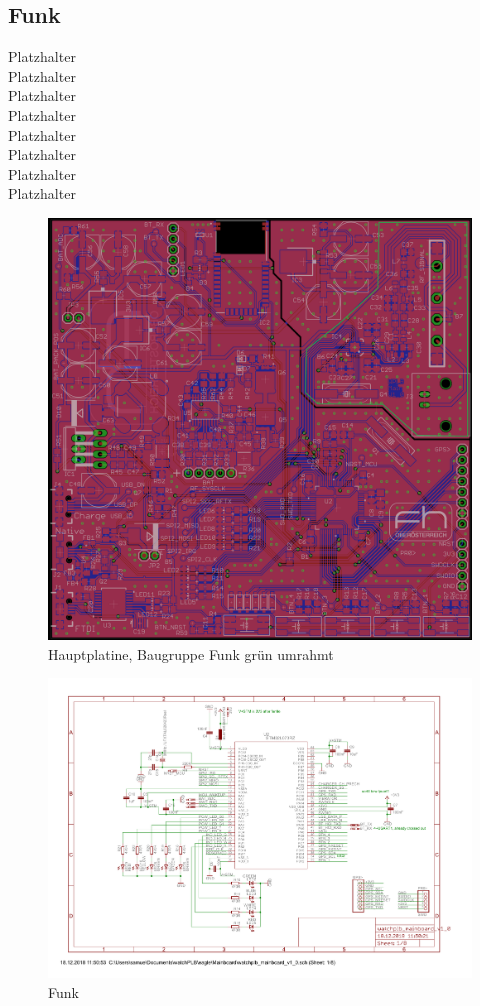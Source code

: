 \documentclass[a4paper]{scrartcl}
\begin{document}
\subsection{Funk}

Platzhalter\\Platzhalter\\Platzhalter\\Platzhalter\\Platzhalter\\Platzhalter\\
Platzhalter\\Platzhalter

\begin{figure}[H]\centering
\includegraphics[page=1, angle=0, width=\linewidth]{../Documentation/pics/mainboard_funk.png}
\caption{Hauptplatine, Baugruppe Funk grün umrahmt}
\end{figure}

\begin{figure}[H]\centering
\includegraphics[page=2, angle=90, width=\linewidth]{../eagle/Mainboard/watchplb_mainboard_v1_0.pdf}
\caption{Funk}
\end{figure}
\end{document}
